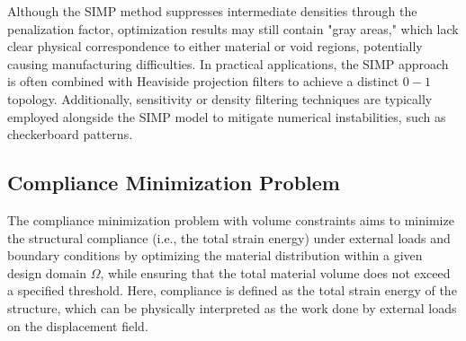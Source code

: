 \documentclass[mathpazo]{cicp}
\begin{document}
Although the SIMP method suppresses intermediate densities through the penalization factor, optimization results may still contain "gray areas," which lack clear physical correspondence to either material or void regions, potentially causing manufacturing difficulties. In practical applications, the SIMP approach is often combined with Heaviside projection filters to achieve a distinct $0-1$ topology. Additionally, sensitivity or density filtering techniques are typically employed alongside the SIMP model to mitigate numerical instabilities, such as checkerboard patterns.

\subsection{Compliance Minimization Problem}
The compliance minimization problem with volume constraints aims to minimize the structural compliance (i.e., the total strain energy) under external loads and boundary conditions by optimizing the material distribution within a given design domain $\Omega$, while ensuring that the total material volume does not exceed a specified threshold. Here, compliance is defined as the total strain energy of the structure, which can be physically interpreted as the work done by external loads on the displacement field.
\end{document}
